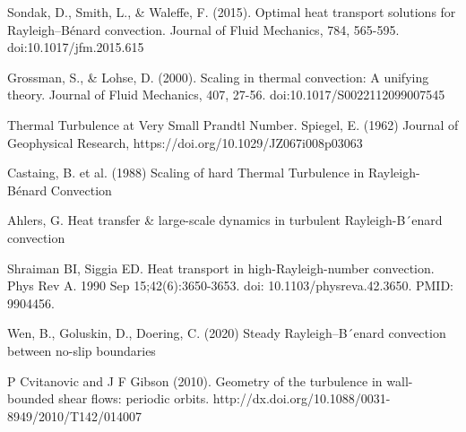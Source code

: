 \documentclass[reprint,amsmath,amssymb,aps]{revtex4-1}
\begin{document}
\begin{thebibliography}{99}
 Sondak, D., Smith, L., \& Waleffe, F. (2015). Optimal heat transport solutions for Rayleigh–Bénard convection. Journal of Fluid Mechanics, 784, 565-595. doi:10.1017/jfm.2015.615

 Grossman, S., \& Lohse, D. (2000). Scaling in thermal convection: A unifying theory. Journal of Fluid Mechanics, 407, 27-56. doi:10.1017/S0022112099007545

 Thermal Turbulence at Very Small Prandtl Number. Spiegel, E. (1962) Journal of Geophysical Research, https://doi.org/10.1029/JZ067i008p03063

 Castaing, B. et al. (1988) Scaling of hard Thermal Turbulence in Rayleigh-B\'enard Convection

 Ahlers, G. Heat transfer \& large-scale dynamics in turbulent Rayleigh-B´enard convection

 Shraiman BI, Siggia ED. Heat transport in high-Rayleigh-number convection. Phys Rev A. 1990 Sep 15;42(6):3650-3653. doi: 10.1103/physreva.42.3650. PMID: 9904456.

 Wen, B., Goluskin, D., Doering, C. (2020) Steady Rayleigh–B´enard convection between no-slip boundaries

 P Cvitanovic and J F Gibson (2010). Geometry of the turbulence in wall-bounded shear flows: periodic orbits. http://dx.doi.org/10.1088/0031-8949/2010/T142/014007


\end{thebibliography}
\end{document}
